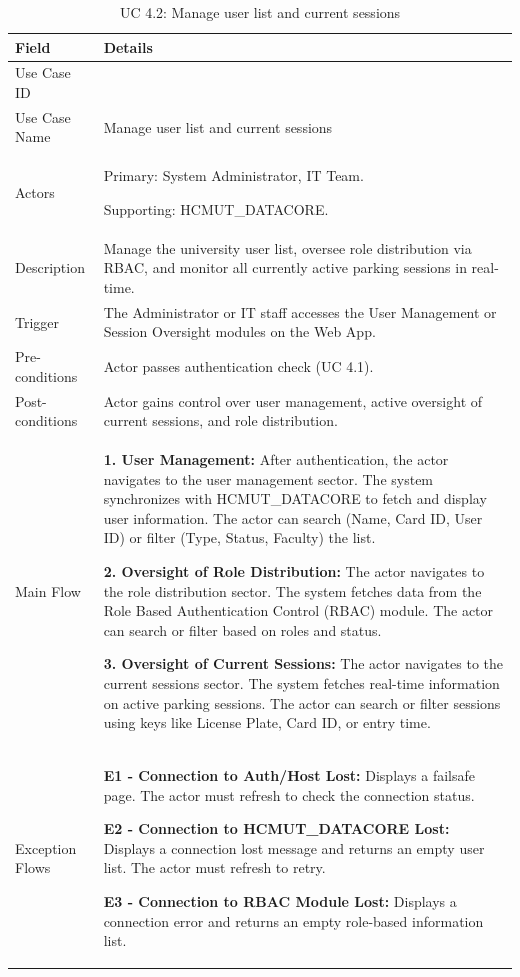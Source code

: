 \begin{table}[H]
\small
\renewcommand{\arraystretch}{1.4}
\begin{tabularx}{\textwidth}{|>{\raggedright\arraybackslash}p{3.5cm}|>{\RaggedRight\arraybackslash}X|}
\hline
\rowcolor{gray!20} \textbf{Field} & \textbf{Details} \\
\hline
Use Case ID & 4.2 \\
\hline
Use Case Name & Manage user list and current sessions \\
\hline
Actors & Primary: System Administrator, IT Team. \par Supporting: HCMUT\_DATACORE. \\
\hline
Description & Manage the university user list, oversee role distribution via RBAC, and monitor all currently active parking sessions in real-time. \\
\hline
Trigger & The Administrator or IT staff accesses the User Management or Session Oversight modules on the Web App. \\
\hline
Pre-conditions & Actor passes authentication check (UC 4.1). \\
\hline
Post-conditions & Actor gains control over user management, active oversight of current sessions, and role distribution. \\
\hline
Main Flow & 
\textbf{1. User Management:} After authentication, the actor navigates to the user management sector. The system synchronizes with HCMUT\_DATACORE to fetch and display user information. The actor can search (Name, Card ID, User ID) or filter (Type, Status, Faculty) the list. \par \vspace{0.5em}
\textbf{2. Oversight of Role Distribution:} The actor navigates to the role distribution sector. The system fetches data from the Role Based Authentication Control (RBAC) module. The actor can search or filter based on roles and status. \par \vspace{0.5em}
\textbf{3. Oversight of Current Sessions:} The actor navigates to the current sessions sector. The system fetches real-time information on active parking sessions. The actor can search or filter sessions using keys like License Plate, Card ID, or entry time. \\
\hline
Exception Flows & 
\textbf{E1 - Connection to Auth/Host Lost:} Displays a failsafe page. The actor must refresh to check the connection status. \par \vspace{0.5em}
\textbf{E2 - Connection to HCMUT\_DATACORE Lost:} Displays a connection lost message and returns an empty user list. The actor must refresh to retry. \par \vspace{0.5em}
\textbf{E3 - Connection to RBAC Module Lost:} Displays a connection error and returns an empty role-based information list. \\
\hline
\end{tabularx}
\caption{UC 4.2: Manage user list and current sessions}
\label{tab:uc4.2}
\end{table}